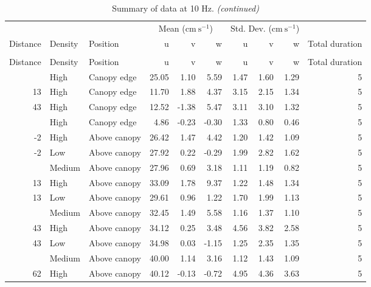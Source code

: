 \documentclass[10pt,]{article}
\begin{document}
\clearpage
\begingroup\fontsize{7}{9}\selectfont

\begin{longtable}{rllrrrrrrr}
\caption{\label{tab:unnamed-chunk-2}Summary of data at 10 Hz.}\\
\toprule
\multicolumn{3}{c}{ } & \multicolumn{3}{c}{Mean ($\text{cm}~\text{s}^{-1}$)} & \multicolumn{3}{c}{Std. Dev. ($\text{cm}~\text{s}^{-1}$)} \\
\cmidrule(l{2pt}r{2pt}){4-6} \cmidrule(l{2pt}r{2pt}){7-9}
Distance & Density & Position & u & v & w & u & v & w & Total duration\\
\midrule
\endfirsthead
\caption[]{\label{tab:unnamed-chunk-2}Summary of data at 10 Hz. \textit{(continued)}}\\
\toprule
Distance & Density & Position & u & v & w & u & v & w & Total duration\\
\midrule
\endhead
\
\endfoot
\bottomrule
\endlastfoot
-2 & High & Canopy edge & 25.05 & 1.10 & 5.59 & 1.47 & 1.60 & 1.29 & 5\\
13 & High & Canopy edge & 11.70 & 1.88 & 4.37 & 3.15 & 2.15 & 1.34 & 5\\
43 & High & Canopy edge & 12.52 & -1.38 & 5.47 & 3.11 & 3.10 & 1.32 & 5\\
\addlinespace
62 & High & Canopy edge & 4.86 & -0.23 & -0.30 & 1.33 & 0.80 & 0.46 & 5\\
-2 & High & Above canopy & 26.42 & 1.47 & 4.42 & 1.20 & 1.42 & 1.09 & 5\\
-2 & Low & Above canopy & 27.92 & 0.22 & -0.29 & 1.99 & 2.82 & 1.62 & 5\\
\addlinespace
-2 & Medium & Above canopy & 27.96 & 0.69 & 3.18 & 1.11 & 1.19 & 0.82 & 5\\
13 & High & Above canopy & 33.09 & 1.78 & 9.37 & 1.22 & 1.48 & 1.34 & 5\\
13 & Low & Above canopy & 29.61 & 0.96 & 1.22 & 1.70 & 1.99 & 1.13 & 5\\
\addlinespace
13 & Medium & Above canopy & 32.45 & 1.49 & 5.58 & 1.16 & 1.37 & 1.10 & 5\\
43 & High & Above canopy & 34.12 & 0.25 & 3.48 & 4.56 & 3.82 & 2.58 & 5\\
43 & Low & Above canopy & 34.98 & 0.03 & -1.15 & 1.25 & 2.35 & 1.35 & 5\\
\addlinespace
43 & Medium & Above canopy & 40.00 & 1.14 & 3.16 & 1.12 & 1.43 & 1.09 & 5\\
62 & High & Above canopy & 40.12 & -0.13 & -0.72 & 4.95 & 4.36 & 3.63 & 5\\

\end{longtable}
\end{document}
